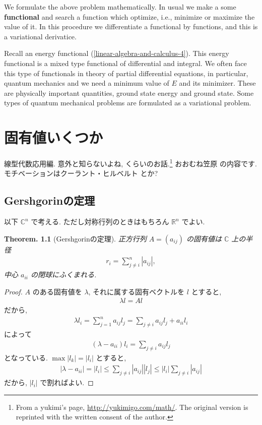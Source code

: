 \documentclass[openany, a4paper, oneside]{book}
\theoremstyle{break}
\newtheorem{thm}{Theorem.}[section]
\theoremstyle{breakdefn}
\newcommand{\abs}[1]{\left|#1\right|}
\newcommand{\rbk}[1]{\left (#1\right)}
\begin{document}
We formulate the above problem mathematically.
In usual we make a some \textbf{functional} and search a function
which optimize, i.e., minimize or maximize the value of it.
In this procedure we differentiate a functional by functions,
and this is a variational derivatice.

Recall an energy functional (\ref{linear-algebra-and-calculus-4}).
This energy functional is a mixed type functional of differential and integral.
We often face this type of functionals in theory of partial differential equations,
in particular, quantum mechanics and we need a minimum value of $E$ and its minimizer.
These are physically important quantities, ground state energy and ground state.
Some types of quantum mechanical problems are formulated as a variational problem.
\chapter{固有値いくつか}
\label{sec-4-2}

線型代数応用編. 意外と知らないよね, くらいのお話.\footnote{From a yukimi's page, \href{http://yukimigo.com/math/}{http://yukimigo.com/math/}.
The original version is reprinted with the written consent of the author.
 }
おおむね笠原 \cite{KoujiKasahara1}の内容です.
モチベーションはクーラント・ヒルベルト \cite{CourantHilbert1}とか?
\section{Gershgorinの定理}
\label{sec-4-2-1}

以下 $\mathbb{C}^n$ で考える. ただし対称行列のときはもちろん $\mathbb{R}^n$  でよい.
\begin{thm}[Gershgorinの定理]
 正方行列 $A = (a_{ij})$ の固有値は $\mathbb{C}$ 上の半径
  \begin{align}
   r_i
   =
   \sum_{j\neq i}^n \abs{a_{ij}},
  \end{align}
 中心 $a_{ii}$ の閉球にふくまれる.
\end{thm}

\begin{proof}
$A$ のある固有値を $\lambda$, それに属する固有ベクトルを
$l$ とすると,
\begin{align}
 \lambda l
 =
 Al
\end{align}
だから,
\begin{align}
 \lambda l_i
 =
 \sum_{j=1}^n
 a_{ij} l_j
 =
 \sum_{j \neq i} a_{ij} l_j  + a_{ii} l_i
\end{align}
によって
\begin{align}
 \rbk{\lambda - a_{ii}} l_i
 =
 \sum_{j \neq i} a_{ij} l_j
\end{align}
となっている.
$\max \abs{l_k} = \abs{l_i}$ とすると,
\begin{align}
 \abs{\lambda - a_{ii}}
 =
 \abs{l_i}
 \le
 \sum_{j \neq i} \abs{a_{ij}} \abs{l_j}
 \le
 \abs{l_i} \sum_{j \neq i} \abs{a_{ij}}
\end{align}
だから, $|l_i|$ で割ればよい.
\end{proof}
\end{document}
